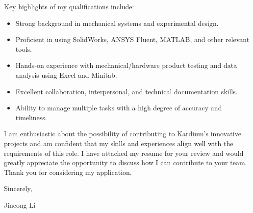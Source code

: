 \documentclass[letterpaper,11pt]{article}
\begin{document}
Key highlights of my qualifications include:

\begin{itemize}
    \item Strong background in mechanical systems and experimental design.
    \item Proficient in using SolidWorks, ANSYS Fluent, MATLAB, and other relevant tools.
    \item Hands-on experience with mechanical/hardware product testing and data analysis using Excel and Minitab.
    \item Excellent collaboration, interpersonal, and technical documentation skills.
    \item Ability to manage multiple tasks with a high degree of accuracy and timeliness.
\end{itemize}

I am enthusiastic about the possibility of contributing to Kardium’s innovative projects and am confident that my skills and experiences align well with the requirements of this role. I have attached my resume for your review and would greatly appreciate the opportunity to discuss how I can contribute to your team. Thank you for considering my application.

Sincerely,

Jincong Li
\end{document}
